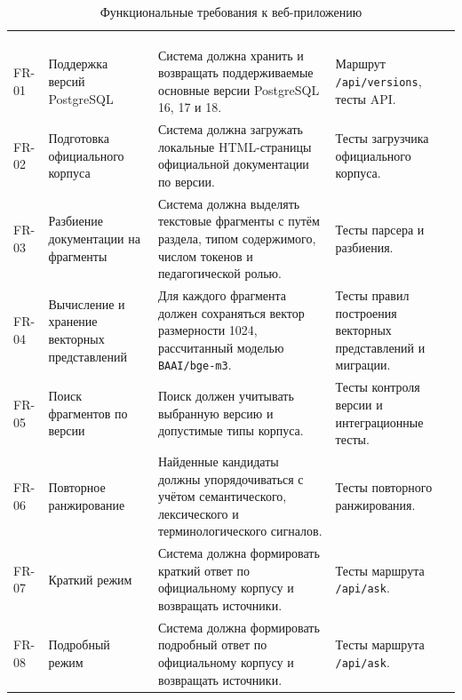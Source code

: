\begingroup
\centering
\small
{}\selectfont
\setlength{\tabcolsep}{2pt}
\begin{longtable}{|P{0.08\textwidth}|P{0.22\textwidth}|P{0.42\textwidth}|P{0.18\textwidth}|}
\caption{Функциональные требования к веб-приложению}\label{tab:analysis-fr}\\
\hline
{} &  &  &  \\ \hline
{} &  &  &  \\ \hline
\endfirsthead
{}\\
\hline
{} &  &  &  \\ \hline
\endhead
\endfoot
FR-01 & Поддержка версий PostgreSQL & Система должна хранить и возвращать поддерживаемые основные версии PostgreSQL 16, 17 и 18. & Маршрут \texttt{/api/versions}, тесты API. \\ \hline
FR-02 & Подготовка официального корпуса & Система должна загружать локальные HTML-страницы официальной документации по версии. & Тесты загрузчика официального корпуса. \\ \hline
FR-03 & Разбиение документации на фрагменты & Система должна выделять текстовые фрагменты с путём раздела, типом содержимого, числом токенов и педагогической ролью. & Тесты парсера и разбиения. \\ \hline
FR-04 & Вычисление и хранение векторных представлений & Для каждого фрагмента должен сохраняться вектор размерности 1024, рассчитанный моделью \texttt{BAAI/bge-m3}. & Тесты правил построения векторных представлений и миграции. \\ \hline
FR-05 & Поиск фрагментов по версии & Поиск должен учитывать выбранную версию и допустимые типы корпуса. & Тесты контроля версии и интеграционные тесты. \\ \hline
FR-06 & Повторное ранжирование & Найденные кандидаты должны упорядочиваться с учётом семантического, лексического и терминологического сигналов. & Тесты повторного ранжирования. \\ \hline
FR-07 & Краткий режим & Система должна формировать краткий ответ по официальному корпусу и возвращать источники. & Тесты маршрута \texttt{/api/ask}. \\ \hline
FR-08 & Подробный режим & Система должна формировать подробный ответ по официальному корпусу и возвращать источники. & Тесты маршрута \texttt{/api/ask}. \\ \hline

\end{longtable}
